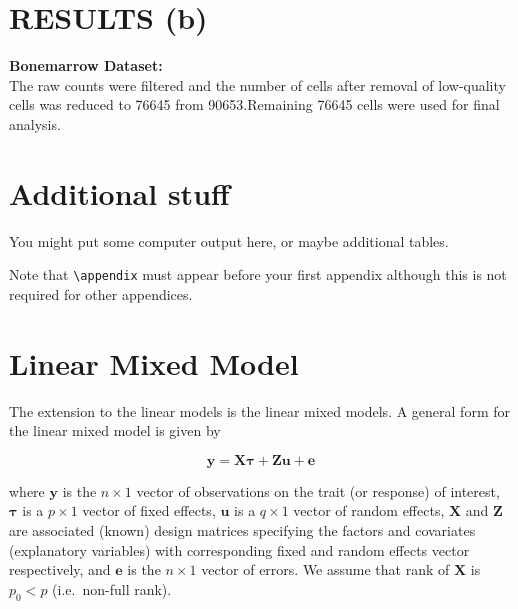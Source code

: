 \documentclass{sydneythesis}
\begin{document}
\chapter{RESULTS (b)}\label{ch:resultsb}

\textbf{Bonemarrow Dataset:}\\
The raw counts were filtered and the number of cells after removal of
low-quality cells was reduced to 76645 from 90653.Remaining 76645 cells
were used for final analysis.

\appendix

\chapter{Additional stuff}\label{additional-stuff}

You might put some computer output here, or maybe additional tables.

Note that \texttt{\textbackslash{}appendix} must appear before your
first appendix although this is not required for other appendices.

\chapter{Linear Mixed Model}\label{lmm}

The extension to the linear models is the linear mixed models. A general
form for the linear mixed model is given by

\begin{equation}
\boldsymbol{y} = \boldsymbol{X}\boldsymbol{\tau} + \boldsymbol{Z}\boldsymbol{u} + \boldsymbol{e} \label{eq:lmm}
\end{equation}

where \(\boldsymbol{y}\) is the \(n\times 1\) vector of observations on
the trait (or response) of interest, \(\boldsymbol{\tau}\) is a
\(p \times 1\) vector of fixed effects, \(\boldsymbol{u}\) is a
\(q \times 1\) vector of random effects, \(\boldsymbol{X}\) and
\(\boldsymbol{Z}\) are associated (known) design matrices specifying the
factors and covariates (explanatory variables) with corresponding fixed
and random effects vector respectively, and \(\boldsymbol{e}\) is the
\(n\times 1\) vector of errors. We assume that rank of
\(\boldsymbol{X}\) is \(p_0 < p\) (i.e.~non-full rank).
\end{document}
